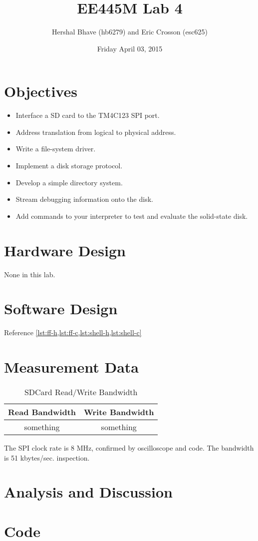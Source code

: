 \documentclass[12pt]{article}
\title{EE445M Lab 4}
\author{Hershal Bhave (hb6279) and Eric Crosson (esc625)}
\date{Friday April 03, 2015}
\begin{document}
\maketitle

\section{Objectives}
\begin{itemize}

\item Interface a SD card to the TM4C123 SPI port.
\item Address translation from logical to physical address.
\item Write a file-system driver.
\item Implement a disk storage protocol.
\item Develop a simple directory system.
\item Stream debugging information onto the disk.
\item Add commands to your interpreter to test and evaluate the
  solid-state disk.
\end{itemize}

\section{Hardware Design}
None in this lab.

\section{Software Design}
Reference \cref{lst:ff-h,lst:ff-c,lst:shell-h,lst:shell-c}

\section{Measurement Data}
\begin{table}
  \centering
  \caption{SDCard Read/Write Bandwidth}
  \begin{tabular}{c|c}
    Read Bandwidth & Write Bandwidth \\
    \hline
    something & something \\
  \end{tabular}
  The SPI clock rate is 8 MHz, confirmed by oscilloscope and code. The
  bandwidth is 51 kbytes/sec.
  inspection.
\end{table}
\section{Analysis and Discussion}


\newpage
\section{Code}
\end{document}
